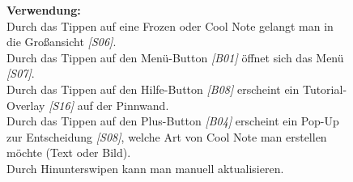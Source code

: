 \documentclass[a4paper]{scrreprt}
\begin{document}
\begin{figure}[h]
\begin{minipage}[b]{0.55\linewidth}
\begin{itemize}
    			\end{itemize}
    			
    			\hfill
    			
    			\textbf{Verwendung:}\\
    			Durch das Tippen auf eine Frozen oder Cool
    			Note gelangt man in die Großansicht \textit{{[}S06{]}}.
    			\\
    			Durch das Tippen auf den Menü-Button \textit{{[}B01{]}} 
    			öffnet sich das Menü \textit{{[}S07{]}}.\\
    			Durch das Tippen auf den Hilfe-Button \textit{{[}B08{]}} erscheint
    			ein Tutorial-Overlay \textit{{[}S16{]}} auf der Pinnwand.	\\
    			Durch das Tippen auf den  Plus-Button \textit{[B04]} erscheint 
    			ein Pop-Up zur Entscheidung \textit{{[}S08{]}}, welche Art von Cool Note man erstellen möchte (Text oder
    			Bild).\\
    			Durch Hinunterswipen kann man manuell aktualisieren.
    			
    		\end{minipage}
    	\end{figure}
    	
    	
    
    	
    	
    	
    	
    	\clearpage
    	
\end{document}
